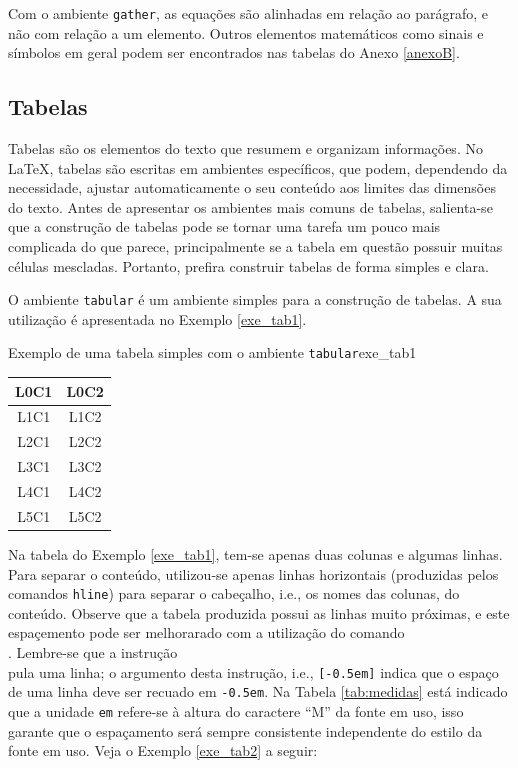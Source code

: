 Com o ambiente {\tt gather}, as equações são alinhadas em relação ao parágrafo, e não com relação a um elemento. Outros elementos matemáticos como sinais e símbolos em geral podem ser encontrados nas tabelas do Anexo \ref{anexoB}.

\subsection{Tabelas}
\label{sec:tabs}

Tabelas são os elementos do texto que resumem e organizam informações. No \LaTeX{}, tabelas são escritas em ambientes específicos, que podem, dependendo da necessidade, ajustar automaticamente o seu conteúdo aos limites das dimensões do texto. Antes de apresentar os ambientes mais comuns de tabelas, salienta-se que a construção de tabelas pode se tornar uma tarefa um pouco mais complicada do que parece, principalmente se a tabela em questão possuir muitas células mescladas. Portanto, prefira construir tabelas de forma simples e clara.

O ambiente {\tt tabular} é um ambiente simples para a construção de tabelas. A sua utilização é apresentada no Exemplo \ref{exe_tab1}.

\begin{texexptitled}[breakable,center lower,enhanced,middle=2mm]{Exemplo de uma tabela simples com o ambiente {\tt tabular}}{exe_tab1}
\begin{tabular}{c c}
\hline 
\textbf{L0C1} & \textbf{L0C2} \\
\hline
L1C1 & L1C2 \\
L2C1 & L2C2 \\
L3C1 & L3C2 \\
L4C1 & L4C2 \\
L5C1 & L5C2 \\
\hline
\end{tabular}
\end{texexptitled}

Na tabela do Exemplo \ref{exe_tab1}, tem-se apenas duas colunas e algumas linhas. Para separar o conteúdo, utilizou-se apenas linhas horizontais (produzidas pelos comandos {\tt hline}) para separar o cabeçalho, i.e., os nomes das colunas, do conteúdo. Observe que a tabela produzida possui as linhas muito próximas, e este espaçemento pode ser melhorarado com a utilização do comando \texttt{\\[-0.5em]}. Lembre-se que a instrução \texttt{\\} pula uma linha; o argumento desta instrução, i.e., \texttt{[-0.5em]} indica que o espaço de uma linha deve ser recuado em {\tt -0.5em}. Na Tabela \ref{tab:medidas} está indicado que a unidade {\tt em} refere-se à altura do caractere ``M'' da fonte em uso, isso garante que o espaçamento será sempre consistente independente do estilo da fonte em uso. Veja o Exemplo \ref{exe_tab2} a seguir:

